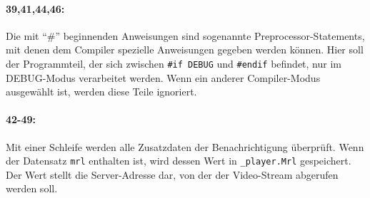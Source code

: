 \paragraph{39,41,44,46:} Die mit \enquote{\#} beginnenden Anweisungen sind sogenannte Preprocessor-Statements, mit denen dem Compiler spezielle Anweisungen gegeben werden können.
Hier soll der Programmteil, der sich zwischen \texttt{\#if DEBUG} und \texttt{\#endif} befindet, nur im DEBUG-Modus verarbeitet werden.
Wenn ein anderer Compiler-Modus ausgewählt ist, werden diese Teile ignoriert.
\paragraph{42-49:} Mit einer Schleife werden alle Zusatzdaten der Benachrichtigung überprüft.
Wenn der Datensatz \texttt{mrl} enthalten ist, wird dessen Wert in \texttt{\_player.Mrl} gespeichert.
Der Wert stellt die Server-Adresse dar, von der der Video-Stream abgerufen werden soll.
